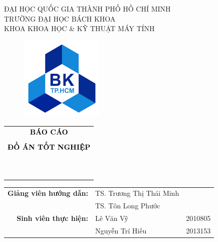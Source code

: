 \documentclass[12pt]{report}
\begin{document}
\begin{titlepage}
	\begin{center}
		ĐẠI HỌC QUỐC GIA THÀNH PHỐ HỒ CHÍ MINH \\
		TRƯỜNG ĐẠI HỌC BÁCH KHOA \\
		KHOA KHOA HỌC \& KỸ THUẬT MÁY TÍNH
	\end{center}
	\renewcommand{\rmdefault}{ppl}
	\vspace{1cm}
	\begin{figure}[h!]
		\begin{center}
			\includegraphics[width=4cm, height=4cm]{Pictures/logoBK.png}
		\end{center}
	\end{figure}
	\vspace{1cm}

	\begin{center}
		\begin{tabular}{c}
			\textbf{\large\textcolor{black}{BÁO CÁO}}                                    \\\\
			\textbf{\large\textcolor{black}{ĐỒ ÁN TỐT NGHIỆP}}                           \\\\
			~~                                                                           \\
			\hline
			\\
			\textbf{\large \color{black}{Phát triển và mở rộng}}                         \\
			\textbf{\large \color{black}{nền tảng đánh giá quy trình nghiệp vụ tự động}} \\
			\\
			\hline
		\end{tabular}
	\end{center}
	\vspace{2cm}

	\begin{table}[H]
		\centering
		\begin{tabular}{rll}
			\textbf{Giảng viên hướng dẫn:} & TS. Trương Thị Thái Minh &         \\
			                               & TS. Tôn Long Phước       &         \\
			\textbf{Sinh viên thực hiện:}  & Lê Văn Vỹ                & 2010805 \\
			                               & Nguyễn Trí Hiếu          & 2013153 \\
		\end{tabular}
	\end{table}


\end{titlepage}
\end{document}
